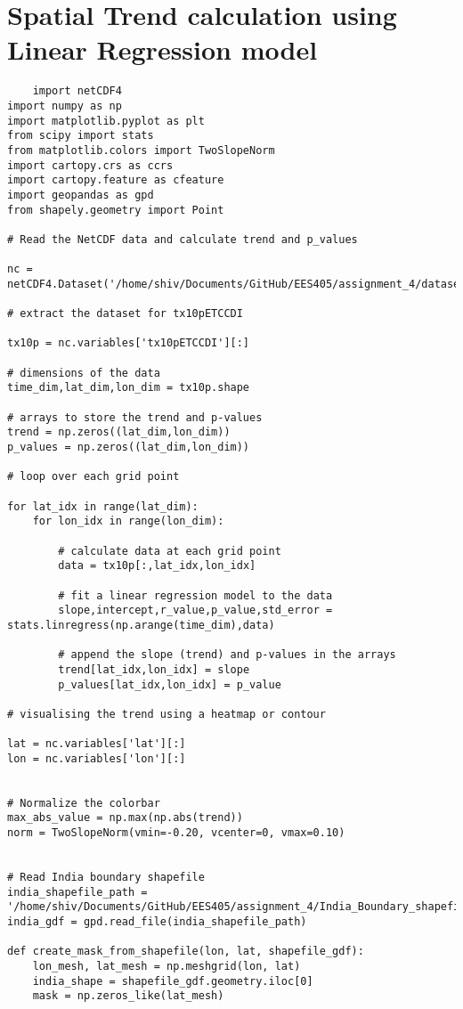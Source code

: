 \documentclass[a4paper, 12pt, twoside]{report}
\begin{document}
\section{Spatial Trend calculation using Linear Regression model}


\begin{lstlisting}
    import netCDF4
import numpy as np
import matplotlib.pyplot as plt
from scipy import stats
from matplotlib.colors import TwoSlopeNorm
import cartopy.crs as ccrs
import cartopy.feature as cfeature
import geopandas as gpd
from shapely.geometry import Point

# Read the NetCDF data and calculate trend and p_values

nc = netCDF4.Dataset('/home/shiv/Documents/GitHub/EES405/assignment_4/datasets/tx10p.india.future.nc')

# extract the dataset for tx10pETCCDI

tx10p = nc.variables['tx10pETCCDI'][:] 

# dimensions of the data
time_dim,lat_dim,lon_dim = tx10p.shape

# arrays to store the trend and p-values
trend = np.zeros((lat_dim,lon_dim))
p_values = np.zeros((lat_dim,lon_dim))

# loop over each grid point 

for lat_idx in range(lat_dim):
    for lon_idx in range(lon_dim):
        
        # calculate data at each grid point
        data = tx10p[:,lat_idx,lon_idx]
        
        # fit a linear regression model to the data
        slope,intercept,r_value,p_value,std_error = stats.linregress(np.arange(time_dim),data)
        
        # append the slope (trend) and p-values in the arrays
        trend[lat_idx,lon_idx] = slope
        p_values[lat_idx,lon_idx] = p_value
        
# visualising the trend using a heatmap or contour 

lat = nc.variables['lat'][:]
lon = nc.variables['lon'][:]


# Normalize the colorbar
max_abs_value = np.max(np.abs(trend))
norm = TwoSlopeNorm(vmin=-0.20, vcenter=0, vmax=0.10)


# Read India boundary shapefile
india_shapefile_path = '/home/shiv/Documents/GitHub/EES405/assignment_4/India_Boundary_shapefile/India_Boundary.shp'
india_gdf = gpd.read_file(india_shapefile_path)

def create_mask_from_shapefile(lon, lat, shapefile_gdf):
    lon_mesh, lat_mesh = np.meshgrid(lon, lat)
    india_shape = shapefile_gdf.geometry.iloc[0]
    mask = np.zeros_like(lat_mesh)


\end{lstlisting}
\end{document}
